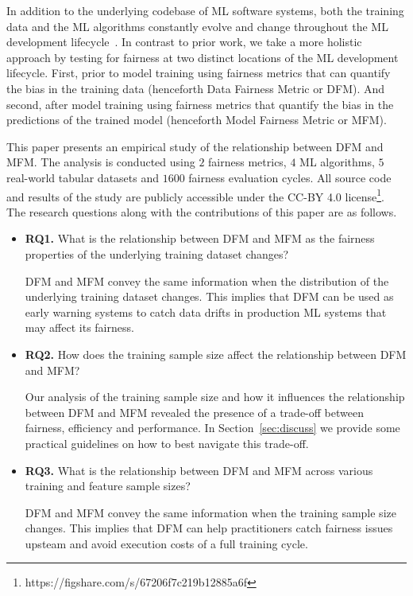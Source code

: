 \documentclass{article}
\begin{document}
In addition to the underlying codebase of ML software systems, both
the training data and the ML algorithms constantly evolve and change
throughout the ML development
lifecycle \cite{sculley2015hidden,bosch2021engineering,hutchinson2021towards}.
In contrast to prior work, we take a more holistic approach by testing
for fairness at two distinct locations of the ML development
lifecycle. First, prior to model training using fairness metrics that
can quantify the bias in the training data (henceforth Data Fairness
Metric or DFM). And second, after model training using fairness
metrics that quantify the bias in the predictions of the trained model
(henceforth Model Fairness Metric or MFM).

This paper presents an empirical study of the relationship between DFM
and MFM. The analysis is conducted using $2$ fairness metrics, $4$ ML
algorithms, $5$ real-world tabular datasets and $1600$ fairness
evaluation cycles. All source code and results of the study are
publicly accessible under the CC-BY 4.0
license\footnote{https://figshare.com/s/67206f7c219b12885a6f}. The
research questions along with the contributions of this paper are as
follows.

\begin{itemize}
  \item{\textbf{RQ1.}} What is the relationship between DFM and MFM as the
    fairness properties of the underlying training dataset changes?

    DFM and MFM convey the same information when the distribution of
    the underlying training dataset changes. This implies that DFM can
    be used as early warning systems to catch data drifts in
    production ML systems that may affect its fairness.

  \item{\textbf{RQ2.}} How does the training sample size affect the
    relationship between DFM and MFM?

    Our analysis of the training sample size and how it influences the
    relationship between DFM and MFM revealed the presence of
    a trade-off between fairness, efficiency and performance. In
    Section \ref{sec:discuss} we provide some practical guidelines on
    how to best navigate this trade-off.

  \item{\textbf{RQ3.}} What is the relationship between DFM and MFM across
    various training and feature sample sizes?

    DFM and MFM convey the same information when the training sample
    size changes. This implies that DFM can help practitioners catch
    fairness issues upsteam and avoid execution costs of a full
    training cycle.
\end{itemize}
\end{document}
